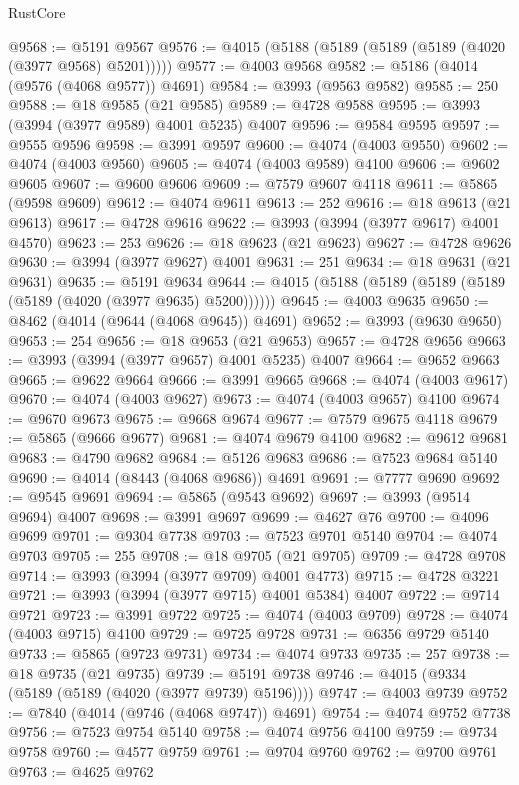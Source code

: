 \begin{lexlean}{RustCore}
\begin{coremodule}
@9568 := @5191 @9567
@9576 := @4015 (@5188 (@5189 (@5189 (@5189 (@4020 (@3977 @9568) @5201)))))
@9577 := @4003 @9568
@9582 := @5186 (@4014 (@9576 (@4068 @9577)) @4691)
@9584 := @3993 (@9563 @9582)
@9585 := 250
@9588 := @18 @9585 (@21 @9585)
@9589 := @4728 @9588
@9595 := @3993 (@3994 (@3977 @9589) @4001 @5235) @4007
@9596 := @9584 @9595
@9597 := @9555 @9596
@9598 := @3991 @9597
@9600 := @4074 (@4003 @9550)
@9602 := @4074 (@4003 @9560)
@9605 := @4074 (@4003 @9589) @4100
@9606 := @9602 @9605
@9607 := @9600 @9606
@9609 := @7579 @9607 @4118
@9611 := @5865 (@9598 @9609)
@9612 := @4074 @9611
@9613 := 252
@9616 := @18 @9613 (@21 @9613)
@9617 := @4728 @9616
@9622 := @3993 (@3994 (@3977 @9617) @4001 @4570)
@9623 := 253
@9626 := @18 @9623 (@21 @9623)
@9627 := @4728 @9626
@9630 := @3994 (@3977 @9627) @4001
@9631 := 251
@9634 := @18 @9631 (@21 @9631)
@9635 := @5191 @9634
@9644 := @4015 (@5188 (@5189 (@5189 (@5189 (@5189 (@4020 (@3977 @9635) @5200))))))
@9645 := @4003 @9635
@9650 := @8462 (@4014 (@9644 (@4068 @9645)) @4691)
@9652 := @3993 (@9630 @9650)
@9653 := 254
@9656 := @18 @9653 (@21 @9653)
@9657 := @4728 @9656
@9663 := @3993 (@3994 (@3977 @9657) @4001 @5235) @4007
@9664 := @9652 @9663
@9665 := @9622 @9664
@9666 := @3991 @9665
@9668 := @4074 (@4003 @9617)
@9670 := @4074 (@4003 @9627)
@9673 := @4074 (@4003 @9657) @4100
@9674 := @9670 @9673
@9675 := @9668 @9674
@9677 := @7579 @9675 @4118
@9679 := @5865 (@9666 @9677)
@9681 := @4074 @9679 @4100
@9682 := @9612 @9681
@9683 := @4790 @9682
@9684 := @5126 @9683
@9686 := @7523 @9684 @5140
@9690 := @4014 (@8443 (@4068 @9686)) @4691
@9691 := @7777 @9690
@9692 := @9545 @9691
@9694 := @5865 (@9543 @9692)
@9697 := @3993 (@9514 @9694) @4007
@9698 := @3991 @9697
@9699 := @4627 @76
@9700 := @4096 @9699
@9701 := @9304 @7738
@9703 := @7523 @9701 @5140
@9704 := @4074 @9703
@9705 := 255
@9708 := @18 @9705 (@21 @9705)
@9709 := @4728 @9708
@9714 := @3993 (@3994 (@3977 @9709) @4001 @4773)
@9715 := @4728 @3221
@9721 := @3993 (@3994 (@3977 @9715) @4001 @5384) @4007
@9722 := @9714 @9721
@9723 := @3991 @9722
@9725 := @4074 (@4003 @9709)
@9728 := @4074 (@4003 @9715) @4100
@9729 := @9725 @9728
@9731 := @6356 @9729 @5140
@9733 := @5865 (@9723 @9731)
@9734 := @4074 @9733
@9735 := 257
@9738 := @18 @9735 (@21 @9735)
@9739 := @5191 @9738
@9746 := @4015 (@9334 (@5189 (@5189 (@4020 (@3977 @9739) @5196))))
@9747 := @4003 @9739
@9752 := @7840 (@4014 (@9746 (@4068 @9747)) @4691)
@9754 := @4074 @9752 @7738
@9756 := @7523 @9754 @5140
@9758 := @4074 @9756 @4100
@9759 := @9734 @9758
@9760 := @4577 @9759
@9761 := @9704 @9760
@9762 := @9700 @9761
@9763 := @4625 @9762

\end{coremodule}
\end{lexlean}
